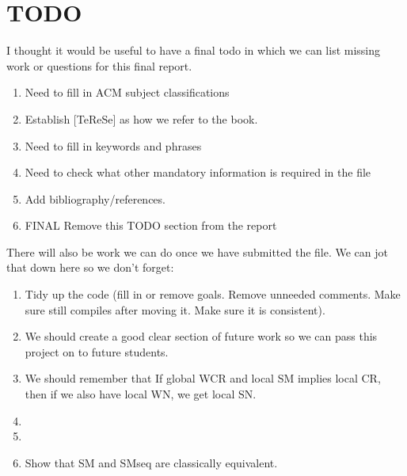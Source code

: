 \section{TODO}

I thought it would be useful to have a final todo in which we can list missing work or questions for this final report.

\begin{enumerate}
    \item Need to fill in ACM subject classifications
    \item Establish [TeReSe] as how we refer to the book.
    \item Need to fill in keywords and phrases
    \item Need to check what other mandatory information is required in the file 
    \item Add bibliography/references.
    \item FINAL Remove this TODO section from the report 
\end{enumerate}

There will also be work we can do once we have submitted the file. We can jot that down here so we don't forget:

\begin{enumerate}
    \item Tidy up the code (fill in or remove goals. Remove unneeded comments. Make sure still compiles after moving it. Make sure it is consistent).
    \item We should create a good clear section of future work so we can pass this project on to future students.
    \item {We should remember that If global WCR and local SM implies local CR, then if we also have local WN, we get local SN.}
    \item {}
    \item {}
    \item Show that SM and SMseq are classically equivalent.
\end{enumerate}